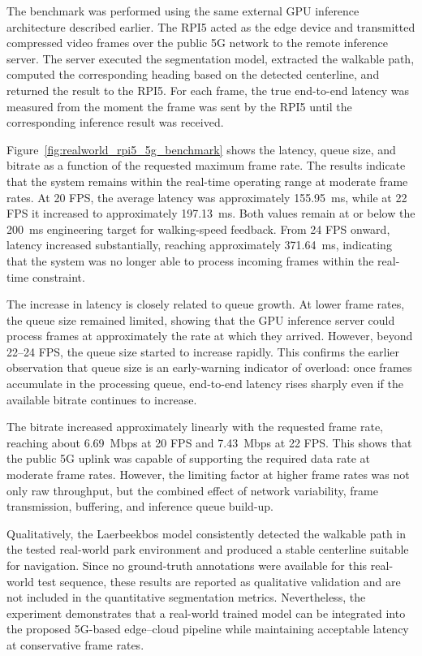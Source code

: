\documentclass{ieeeaccess}
\begin{document}
The benchmark was performed using the same external GPU inference architecture described earlier. The RPI5 acted as the edge device and transmitted compressed video frames over the public 5G network to the remote inference server. The server executed the segmentation model, extracted the walkable path, computed the corresponding heading based on the detected centerline, and returned the result to the RPI5. For each frame, the true end-to-end latency was measured from the moment the frame was sent by the RPI5 until the corresponding inference result was received.



Figure~\ref{fig:realworld_rpi5_5g_benchmark} shows the latency, queue size, and bitrate as a function of the requested maximum frame rate. The results indicate that the system remains within the real-time operating range at moderate frame rates. At 20 FPS, the average latency was approximately 155.95~ms, while at 22 FPS it increased to approximately 197.13~ms. Both values remain at or below the 200~ms engineering target for walking-speed feedback. From 24 FPS onward, latency increased substantially, reaching approximately 371.64~ms, indicating that the system was no longer able to process incoming frames within the real-time constraint.

The increase in latency is closely related to queue growth. At lower frame rates, the queue size remained limited, showing that the GPU inference server could process frames at approximately the rate at which they arrived. However, beyond 22--24 FPS, the queue size started to increase rapidly. This confirms the earlier observation that queue size is an early-warning indicator of overload: once frames accumulate in the processing queue, end-to-end latency rises sharply even if the available bitrate continues to increase.

The bitrate increased approximately linearly with the requested frame rate, reaching about 6.69~Mbps at 20 FPS and 7.43~Mbps at 22 FPS. This shows that the public 5G uplink was capable of supporting the required data rate at moderate frame rates. However, the limiting factor at higher frame rates was not only raw throughput, but the combined effect of network variability, frame transmission, buffering, and inference queue build-up.

Qualitatively, the Laerbeekbos model consistently detected the walkable path in the tested real-world park environment and produced a stable centerline suitable for navigation. Since no ground-truth annotations were available for this real-world test sequence, these results are reported as qualitative validation and are not included in the quantitative segmentation metrics. Nevertheless, the experiment demonstrates that a real-world trained model can be integrated into the proposed 5G-based edge--cloud pipeline while maintaining acceptable latency at conservative frame rates.
\end{document}
